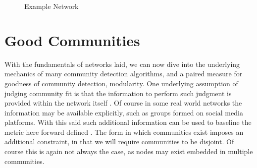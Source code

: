 \documentclass[a4paper, 10pt, twocolumn]{article}
\begin{document}
\begin{figure}[t]
       \centering
       \caption{Example Network}
       \label{fig:ex_network}
\end{figure}


\section{Good Communities}

With the fundamentals of networks laid, we can now dive into the underlying mechanics of many community detection algorithms, and a paired measure for goodness of community detection, modularity.
One underlying assumption of judging community fit is that the information to perform such judgment is provided within the network itself \cite{network_science}.
Of course in some real world networks the information may be available explicitly, such as groups formed on social media platforms.
With this said such additional information can be used to baseline the metric here forward defined \cite{finding_and_evaling_comm_struct}.
The form in which communities exist imposes an additional constraint, in that we will require communities to be disjoint.
Of course this is again not always the case, as nodes may exist embedded in multiple communities.
\end{document}
